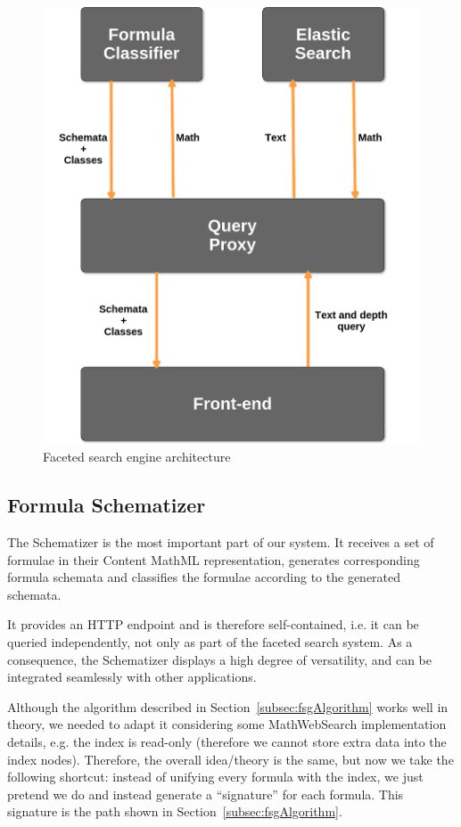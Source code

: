 \documentclass[a4paper,11pt,oneside]{article}
\def\mws{\textsf{MathWebSearch}\xspace}
\def\cmml{\textsf{Content MathML}\xspace}
\begin{document}
\begin{figure}[ht]\centering
    \includegraphics[width=12.8cm]{img/SchemaArchitecture.png}
    \caption{Faceted search engine architecture}\label{fig:sys_architecture}
\end{figure}

\subsection{Formula Schematizer}\label{subsec:fschematizer}
The Schematizer is the most important part of our system. It receives a set of
formulae in their \cmml representation, generates corresponding formula
schemata and classifies the formulae according to the generated schemata.

It provides an HTTP endpoint and is therefore self-contained, i.e. it can be
queried independently, not only as part of the faceted search system.
As a consequence, the Schematizer displays a high degree of versatility,
and can be integrated seamlessly with other applications.

Although the algorithm described in Section~\ref{subsec:fsgAlgorithm} works
well in theory, we needed to adapt it considering some \mws implementation
details, e.g. the index is read-only (therefore we cannot store extra data into
the index nodes). Therefore, the overall idea/theory is the same, but now we take the
following shortcut: instead of unifying every formula with the index, we just
pretend we do and instead generate a ``signature'' for each formula. This
signature is the path shown in Section~\ref{subsec:fsgAlgorithm}.
\end{document}

